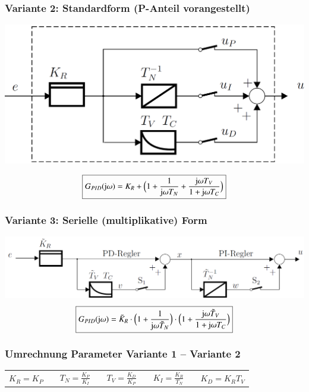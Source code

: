 \subsubsection{Variante 2: Standardform (P-Anteil vorangestellt)}

\begin{minipage}[c]{0.4\columnwidth}
    \includegraphics[width=\columnwidth]{images/pid_regler_aufbau_standardform.png}
\end{minipage}
\hfill
\begin{minipage}[c]{0.55\columnwidth}
    $$ \boxed{ G_{PID}(\mathrm{j} \omega) = K_R + \Big( 1 + \frac{1}{\mathrm{j} \omega T_N} +\frac{\mathrm{j} \omega T_V}{1 + \mathrm{j} \omega T_C} \Big) } $$
\end{minipage}


\subsubsection{Variante 3: Serielle (multiplikative) Form}

    \includegraphics[width=0.8\columnwidth]{images/pid_regler_aufbau_serielle_form.png}
    $$ \boxed{ G_{PID}(\mathrm{j} \omega) = \tilde{K}_R \cdot \Big( 1 + \frac{1}{\mathrm{j} \omega \tilde{T}_N} \Big) \cdot \Big(1 + \frac{\mathrm{j} \omega \tilde{T}_V}{1 + \mathrm{j} \omega T_C} \Big) } $$

\subsubsection{Umrechnung Parameter Variante 1 -- Variante 2}

\begin{tabular}{c c c c c c c c c}
    $K_R = K_P$ & & $T_N = \frac{K_P}{K_I}$ & & $T_V = \frac{K_D}{K_P}$ & & $K_I = \frac{K_R}{T_N}$ & & $ K_D = K_R T_V$
\end{tabular}


